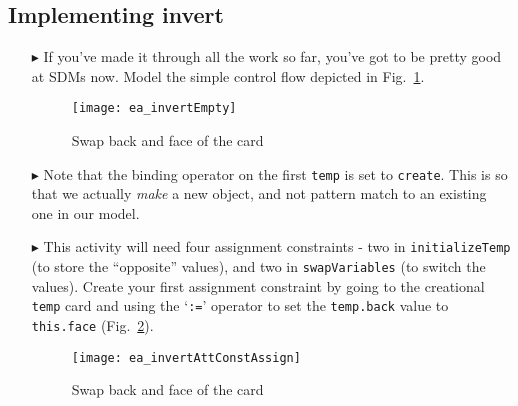 \newpage
\hypertarget{invertCard vis}{}
\subsection{Implementing invert}
\visHeader

\begin{itemize}

\vspace{0.5cm}

\item[$\blacktriangleright$] If you've made it through all the work so far, you've got to be pretty good at SDMs now. Model the simple control flow
depicted in Fig.~\ref{fig:sdm_invertEmpty}.

\vspace{0.5cm}

\begin{figure}[htbp]
\begin{center}
  \texttt{[image: ea\_invertEmpty]}
  \caption{Swap back and face of the card}  
  \label{fig:sdm_invertEmpty}
\end{center}
\end{figure}

\item[$\blacktriangleright$] Note that the binding operator on the first \texttt{temp} is set to \texttt{create}. This is so that we actually \emph{make} a new
object, and not pattern match to an existing one in our model.

\item[$\blacktriangleright$] This activity will need four assignment constraints - two in \texttt{in\-it\-ia\-lize\-Temp} (to store the ``opposite'' values),
and two in \texttt{swapVariables} (to switch the values). Create your first assignment constraint by going to the creational \texttt{temp} card and using the
`\texttt{:=}' operator to set the \texttt{temp.back} value to \texttt{this.face} (Fig.~\ref{fig:sdm_invertAssignment}).

\begin{figure}[htbp]
\begin{center}
  \texttt{[image: ea\_invertAttConstAssign]}
  \caption{Swap back and face of the card}  
  \label{fig:sdm_invertAssignment}
\end{center}
\end{figure}

\clearpage

\vspace*{0.5cm}


\end{itemize}
